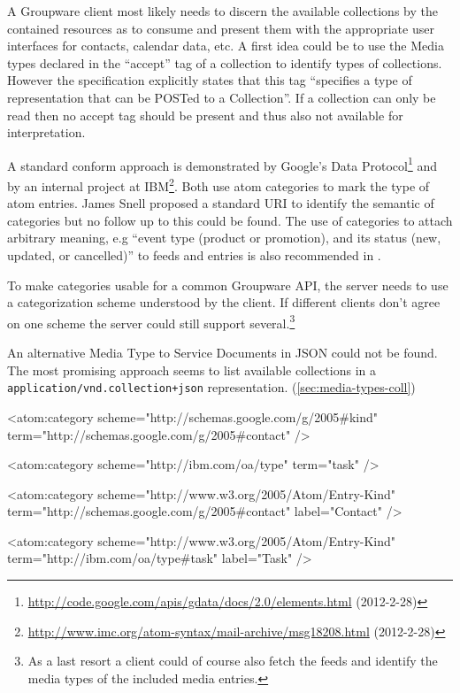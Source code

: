 \documentclass[12pt,a4paper,twoside]{scrartcl}		%
\newcommand{\citeurl}[2]{\url{#1} (#2)}
\begin{document}
A Groupware client most likely needs to discern the available collections by the
contained resources as to consume and present them with the appropriate user
interfaces for contacts, calendar data, etc. A first idea could be to use the
Media types declared in the ``accept'' tag of a collection to identify types of
collections. However the specification explicitly states that this tag
``specifies a type of representation that can be POSTed to a Collection''. If a
collection can only be read then no accept tag should be present and thus also
not available for interpretation.

A standard conform approach is demonstrated by Google's Data
Protocol\footnote{\citeurl{http://code.google.com/apis/gdata/docs/2.0/elements.html}{2012-2-28}}
and by an internal project at
IBM\footnote{\label{snellatomcategory}\citeurl{http://www.imc.org/atom-syntax/mail-archive/msg18208.html}{2012-2-28}}. Both
use atom categories\cite[sec. 8.3.6]{RFC5023} to mark the type of atom
entries. James Snell proposed a standard URI to identify the semantic of
categories but no follow up to this could be
found. The use of categories to attach arbitrary meaning, e.g ``event type
(product or promotion), and its status (new, updated, or cancelled)'' to feeds
and entries is also recommended in \cite[p. 200]{Webber2010}.

To make categories usable for a common Groupware API, the server needs to use a
categorization scheme understood by the client. If different clients don't agree
on one scheme the server could still support several.\footnote{As a last resort
  a client could of course also fetch the feeds and identify the media types of
  the included media entries.}

An alternative Media Type to Service Documents in JSON could not be found. The
most promising approach seems to list available collections in a
\lstinline:application/vnd.collection+json: representation. (\autoref{sec:media-types-coll})

\begin{anylisting}[label=fig:atom-category,
                   caption={ATOM categories as used by Google and IBM to mark entry
                            types and a proposal to use a standard scheme URI for type terms}]
<atom:category
    scheme="http://schemas.google.com/g/2005#kind"
    term="http://schemas.google.com/g/2005#contact" />

<atom:category 
    scheme="http://ibm.com/oa/type"
    term="task" />

<atom:category 
    scheme="http://www.w3.org/2005/Atom/Entry-Kind"
    term="http://schemas.google.com/g/2005#contact"
    label="Contact" />

<atom:category
     scheme="http://www.w3.org/2005/Atom/Entry-Kind"
     term="http://ibm.com/oa/type#task"
     label="Task" />
\end{anylisting}
\end{document}
